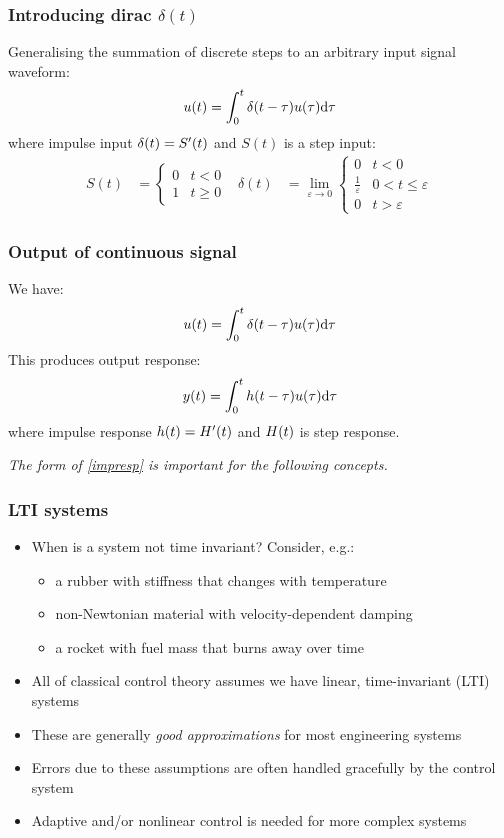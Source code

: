 \documentclass[10pt]{beamer-control}
\begin{document}
\begin{frame}
\frametitle{Introducing dirac $\delta(t)$}

Generalising the summation of discrete steps to an arbitrary input signal waveform:
\begin{align}\label{eq:imp}
u(t) = \int^t_0 \delta(t-\tau)u(\tau)\mathrm{d}\tau
\end{align}
where impulse input $\delta(t)=S'(t)$ and $S(t)$ is a step input:
\begin{align}
S(t) &=
\begin{cases}
0 & t<0 \\
1 & t\ge 0
\end{cases}
&
\delta(t) &= 
\lim_{\varepsilon\to0}
\begin{cases}
0 & t<0 \\
\tfrac{1}{\varepsilon} & 0<t\le\varepsilon \\
0 & t>\varepsilon
\end{cases}
\end{align}

\end{frame}

\begin{frame}
\frametitle{Output of continuous signal}
We have:
\begin{align}\label{eq:imp}
u(t) = \int^t_0 \delta(t-\tau)u(\tau)\mathrm{d}\tau
\end{align}
This produces output response:
\begin{align}\label{eq:impresp}
y(t) = \int^t_0 h(t-\tau)u(\tau)\mathrm{d}\tau
\end{align}
where impulse response $h(t)=H'(t)$ and $H(t)$ is step response.

\alert{\em The form of \eqref{impresp} is important for the following concepts.}

\end{frame}

\begin{frame}
\frametitle{LTI systems}
\begin{itemize}
\item When is a system not time invariant? Consider, e.g.:
\begin{itemize}
\item a rubber with stiffness that changes with temperature
\item non-Newtonian material with velocity-dependent damping
\item a rocket with fuel mass that burns away over time
\end{itemize}
\item All of classical control theory assumes we have linear, time-invariant (LTI) systems
\item These are generally \emph{good approximations} for most engineering systems
\item Errors due to these assumptions are often handled gracefully by the control system
\item Adaptive and/or nonlinear control is needed for more complex systems
\end{itemize}
\end{frame}

\SUMMARYFRAME
\FINALE
\end{document}
